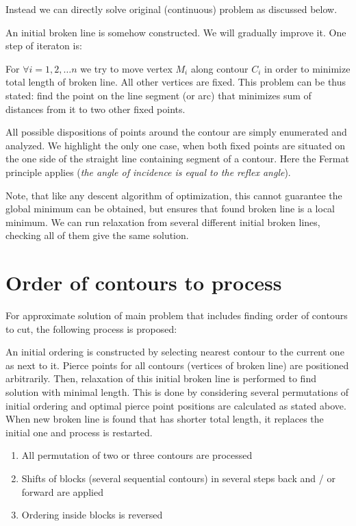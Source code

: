 \documentclass{../download/tPRS2e}
\begin{document}
Instead we can directly solve original
(continuous) problem as discussed below.

An initial broken line is somehow constructed.
We will gradually improve it.
One step of iteraton is:

For $ \forall i = 1, 2, \dots n$ we try to move vertex $M_i$
along contour $C_i$ in order to minimize total length
of broken line. All other vertices are fixed.
This problem can be thus stated:
find the point on the line segment (or arc)
that minimizes sum of distances from it to
two other fixed points.

All possible dispositions of points around the contour
are simply enumerated and analyzed.
We highlight the only one case,
when both fixed points are situated on the one side
of the straight line containing segment of a contour.
Here the Fermat principle applies
(\textit{the angle of incidence is equal to the reflex angle}).

Note, that like any descent algorithm of optimization,
this cannot guarantee
the global minimum can be obtained,
but ensures that found broken line is a local minimum.
We can run relaxation from several different initial broken lines,
checking all of them give the same solution.

\section{Order of contours to process}

For approximate solution of main problem
that includes finding order of contours to cut,
the following process is proposed:

An initial ordering is constructed by selecting 
nearest contour to the current one as next to it.
Pierce points for all contours 
(vertices of broken line) are positioned arbitrarily.
Then, relaxation of this initial broken line 
is performed to find solution with minimal length.
This is done by considering several permutations
of initial ordering and optimal pierce point positions
are calculated as stated above.
When new broken line is found
that has shorter total length,
it replaces the initial one and process is restarted.

\begin{enumerate}
    \item{All permutation of two or three contours are processed}
    \item{Shifts of blocks (several sequential contours) in several steps back and / or forward are applied}
    \item{Ordering inside blocks is reversed}
\end{enumerate}
\end{document}
